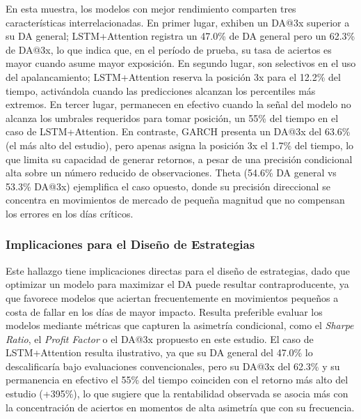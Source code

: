 En esta muestra, los modelos con mejor rendimiento comparten tres caracter\'isticas interrelacionadas. En primer lugar, exhiben un DA@3x superior a su DA general; LSTM+Attention registra un 47.0\% de DA general pero un 62.3\% de DA@3x, lo que indica que, en el per\'iodo de prueba, su tasa de aciertos es mayor cuando asume mayor exposici\'on. En segundo lugar, son selectivos en el uso del apalancamiento; LSTM+Attention reserva la posici\'on 3x para el 12.2\% del tiempo, activ\'andola cuando las predicciones alcanzan los percentiles m\'as extremos. En tercer lugar, permanecen en efectivo cuando la se\~nal del modelo no alcanza los umbrales requeridos para tomar posici\'on, un 55\% del tiempo en el caso de LSTM+Attention. En contraste, GARCH presenta un DA@3x del 63.6\% (el m\'as alto del estudio), pero apenas asigna la posici\'on 3x el 1.7\% del tiempo, lo que limita su capacidad de generar retornos, a pesar de una precisi\'on condicional alta sobre un n\'umero reducido de observaciones. Theta (54.6\% DA general vs 53.3\% DA@3x) ejemplifica el caso opuesto, donde su precisi\'on direccional se concentra en movimientos de mercado de peque\~na magnitud que no compensan los errores en los d\'ias cr\'iticos.

\subsubsection{Implicaciones para el Dise\~no de Estrategias}
\label{subsec:strategy_implications}

Este hallazgo tiene implicaciones directas para el dise\~no de estrategias, dado que optimizar un modelo para maximizar el DA puede resultar contraproducente, ya que favorece modelos que aciertan frecuentemente en movimientos peque\~nos a costa de fallar en los d\'ias de mayor impacto. Resulta preferible evaluar los modelos mediante m\'etricas que capturen la asimetr\'ia condicional, como el \textit{Sharpe Ratio}, el \textit{Profit Factor} o el DA@3x propuesto en este estudio. El caso de LSTM+Attention resulta ilustrativo, ya que su DA general del 47.0\% lo descalificar\'ia bajo evaluaciones convencionales, pero su DA@3x del 62.3\% y su permanencia en efectivo el 55\% del tiempo coinciden con el retorno m\'as alto del estudio (+395\%), lo que sugiere que la rentabilidad observada se asocia m\'as con la concentraci\'on de aciertos en momentos de alta asimetr\'ia que con su frecuencia.


